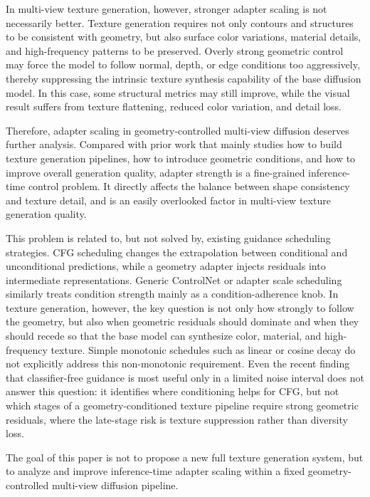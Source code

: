 \documentclass[times,twocolumn,final]{elsarticle}
\begin{document}
In multi-view texture generation, however, stronger adapter scaling is not necessarily better. Texture generation requires not only contours and structures to be consistent with geometry, but also surface color variations, material details, and high-frequency patterns to be preserved. Overly strong geometric control may force the model to follow normal, depth, or edge conditions too aggressively, thereby suppressing the intrinsic texture synthesis capability of the base diffusion model. In this case, some structural metrics may still improve, while the visual result suffers from texture flattening, reduced color variation, and detail loss.

Therefore, adapter scaling in geometry-controlled multi-view diffusion deserves further analysis. Compared with prior work that mainly studies how to build texture generation pipelines, how to introduce geometric conditions, and how to improve overall generation quality, adapter strength is a fine-grained inference-time control problem. It directly affects the balance between shape consistency and texture detail, and is an easily overlooked factor in multi-view texture generation quality.

This problem is related to, but not solved by, existing guidance scheduling strategies. CFG scheduling changes the extrapolation between conditional and unconditional predictions, while a geometry adapter injects residuals into intermediate representations. Generic ControlNet or adapter scale scheduling similarly treats condition strength mainly as a condition-adherence knob. In texture generation, however, the key question is not only how strongly to follow the geometry, but also when geometric residuals should dominate and when they should recede so that the base model can synthesize color, material, and high-frequency texture. Simple monotonic schedules such as linear or cosine decay do not explicitly address this non-monotonic requirement. Even the recent finding that classifier-free guidance is most useful only in a limited noise interval \cite{kynkanniemi2024limited} does not answer this question: it identifies where conditioning helps for CFG, but not which stages of a geometry-conditioned texture pipeline require strong geometric residuals, where the late-stage risk is texture suppression rather than diversity loss.

The goal of this paper is not to propose a new full texture generation system, but to analyze and improve inference-time adapter scaling within a fixed geometry-controlled multi-view diffusion pipeline.
\end{document}
